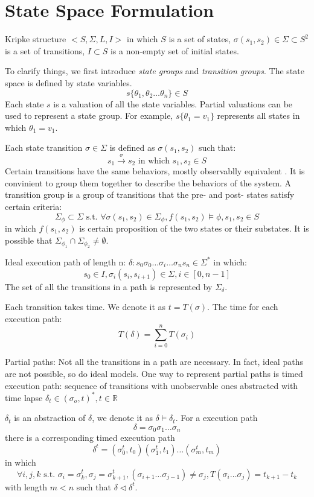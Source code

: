 \documentclass{llncs}
\begin{document}
\section{State Space Formulation}
Kripke structure $<S,\Sigma,L,I>$ in which $S$ is a set of states, $\sigma(s_1,s_2)\in\Sigma\subset S^2$ is a set of transitions, $I\subset S$ is a non-empty set of initial states.

To clarify things, we first introduce \emph{state groups} and \emph{transition groups}. The state space is defined by state variables. 
$$s\{\theta_1,\theta_2\dots \theta_n\}\in S$$
Each state $s$ is a valuation of all the state variables. Partial valuations can be used to represent a state group. For example, $s\{\theta_1=v_1\}$ represents all states in which $\theta_1=v_1$.

Each state transition $\sigma\in\Sigma$ is defined as $\sigma(s_1,s_2)$ such that:
$$s_1\xrightarrow{\sigma}s_2\text{ in which }s_1,s_2\in S$$
Certain transitions have the same behaviors, mostly observablly equivalent . It is convinient to group them together to describe the behaviors of the system. A \textsf{transition group} is a group of transitions that the pre- and post- states satisfy certain criteria:
$$\Sigma_\phi\subset\Sigma \text{ s.t. }\forall\sigma(s_1,s_2)\in\Sigma_\phi,f(s_1,s_2)\models\phi,s_1,s_2\in S$$
in which $f(s_1,s_2)$ is certain proposition of the two states or their substates. It is possible that $\Sigma_{\phi_1}\cap\Sigma_{\phi_2}\neq \emptyset$.

Ideal execution path of length n: $\delta:s_0\sigma_0\dots\sigma_i\dots\sigma_ns_n\in\Sigma^*$ in which: 
$$s_0\in I, \sigma_i(s_i,s_{i+1})\in\Sigma, i\in[0,n-1]$$ 
The set of all the transitions in a path is represented by $\Sigma_\delta$.

Each transition takes time. We denote it as $t=T(\sigma)$. The time for each execution path: $$T(\delta)=\sum_{i=0}^nT(\sigma_i)$$

Partial paths: Not all the transitions in a path are necessary. In fact, ideal paths are not possible, so do ideal models. One way to represent partial paths is timed execution path: sequence of transitions with unobservable ones abstracted with time lapse $\delta_t\in(\sigma_o,t)^*, t\in \mathbb{R}$

$\delta_t$ is an abstraction of $\delta$, we denote it as $\delta\models\delta_t$. For a execution path 
$$\delta=\sigma_0\sigma_1\dots\sigma_n$$
there is a corresponding timed execution path 
$$\delta^t=(\sigma_0^t,t_0)(\sigma_1^t,t_1)\dots(\sigma_m^t,t_m)$$ 
in which
$$\forall i,j,k \text{ s.t. } \sigma_i=\sigma_k^t,\sigma_j=\sigma_{k+1}^t,(\sigma_{i+1}\dots\sigma_{j-1})\neq\sigma_{j},T(\sigma_i\dots\sigma_j)=t_{k+1}-t_k$$
with length $m<n$ such that $\delta\triangleleft\delta^t$. 
\end{document}
